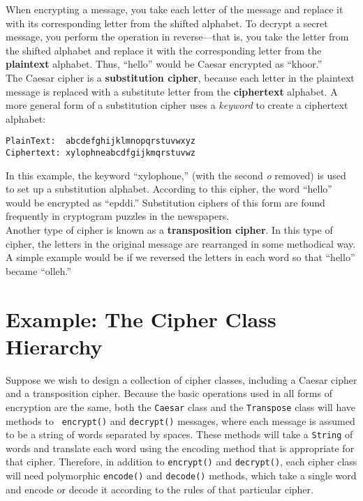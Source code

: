 \noindent When encrypting a message, you take each letter
of the message and replace it with its corresponding letter from the
shifted alphabet.  To decrypt a secret message, you perform the
operation in reverse---that is, you take the letter from the shifted
alphabet and replace it with the corresponding letter from the
{\bf plaintext} alphabet.  Thus, ``hello'' would be
Caesar encrypted as ``khoor.''\\
\hspace*{1pc}The Caesar cipher is a {\bf substitution cipher},
because each letter in the plaintext message is replaced with
a substitute letter from the {\bf ciphertext}
alphabet. A more general form of a
substitution cipher uses a {\it keyword} to
create a ciphertext alphabet:

\begin{jjjlisting}
\begin{lstlisting}
PlainText:  abcdefghijklmnopqrstuvwxyz
Ciphertext: xylophneabcdfgijkmqrstuvwz
\end{lstlisting}
\end{jjjlisting}

\noindent In this example, the keyword ``xylophone,''
(with the second {\it o} removed) is used to set up a substitution
alphabet.  According to this cipher, the word ``hello'' would be encrypted
as ``epddi.''  Substitution ciphers of this form are found frequently in
cryptogram puzzles in the newspapers.\\
\hspace*{1pc}Another type of cipher is known as a {\bf transposition
cipher}. In this type of cipher, the
letters in the original message are rearranged in some methodical way.
A simple example would be if we reversed the letters in each word so
that ``hello'' became ``olleh.'' 

\section{Example: The Cipher Class Hierarchy}

Suppose we wish to design a collection of cipher classes, including a
Caesar cipher and a transposition cipher.  Because the basic
operations used in all forms of encryption are the same, both the 
{\tt Caesar} class and the {\tt Transpose} class will have methods to {\tt
encrypt()} and {\tt decrypt()} messages, where each message is assumed
to be a string of words separated by spaces.  These methods will take
a {\tt String} of words and translate each word using the encoding
method that is appropriate for that cipher.  Therefore, in addition to
{\tt encrypt()} and {\tt decrypt()}, each cipher class will need
polymorphic {\tt encode()} and {\tt decode()} methods, which take a
single word and encode or decode it according to the rules of that
particular cipher.

